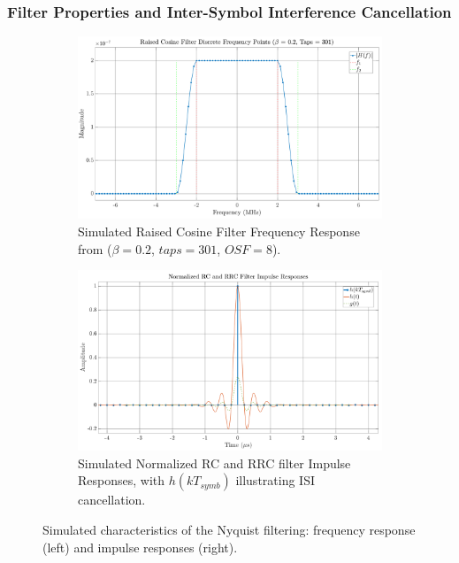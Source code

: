 \documentclass[11pt]{article}
\begin{document}
	\subsubsection{Filter Properties and Inter-Symbol Interference Cancellation}
	\begin{figure}[H]
		\centering
		\begin{subfigure}[b]{0.48\textwidth}
			\centering
			\includegraphics[width=\linewidth]{Images/h-rc-freq}
			\caption{Simulated Raised Cosine Filter Frequency Response from ($\beta = 0.2$, $taps = 301$, $OSF = 8$).}
			\label{fig:h-rc-freq}
		\end{subfigure}
		\hfill %
		\begin{subfigure}[b]{0.48\textwidth}
			\centering
			\includegraphics[width=\linewidth]{Images/h-rc}
			\caption{Simulated Normalized RC and RRC filter Impulse Responses, with $h(kT_{symb})$ illustrating ISI cancellation.}
			\label{fig:h-rc}
		\end{subfigure}
		\caption{Simulated characteristics of the Nyquist filtering: frequency response (left) and impulse responses (right).}
		\label{fig:nyquist-filter-combined}
	\end{figure}
	
\end{document}
